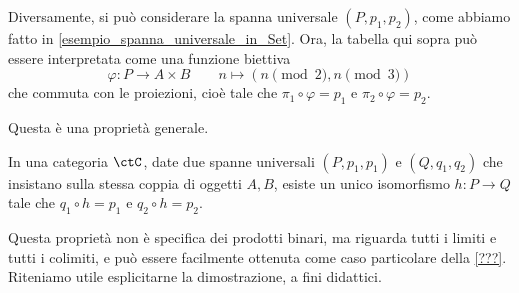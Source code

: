 Diversamente, si può considerare la spanna universale \((P,p_1,p_2)\), come abbiamo fatto in \ref{esempio_spanna_universale_in_Set}. Ora, la tabella qui sopra può essere interpretata come una funzione biettiva
\[
	\varphi\colon P\to A\times B \qquad n\mapsto (n\pmod2,n\pmod3)
\]
che commuta con le proiezioni, cioè  tale che \(\pi_1\circ\varphi=p_1\) e \(\pi_2\circ\varphi=p_2\). 

Questa è una proprietà generale.

\begin{proposition}
	In una categoria \(\ctC\), date due spanne universali \((P,p_1,p_1)\) e \((Q,q_1,q_2)\) che insistano sulla stessa coppia di oggetti \(A,B\), esiste un unico isomorfismo \(h\colon P\to Q\) tale che \(q_1\circ h=p_1\) e \(q_2\circ h=p_2\).
\end{proposition}
Questa proprietà non è specifica dei prodotti binari, ma riguarda tutti i limiti e tutti i colimiti, e può essere facilmente ottenuta come caso particolare della \ref{???}. Riteniamo utile esplicitarne la dimostrazione, a fini didattici.
